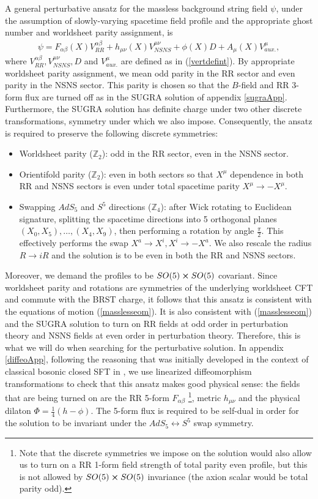 \documentclass[12pt]{article}
\def\ie{\begin{equation}\begin{aligned}}
\def\fe{\end{aligned}\end{equation}}
\numberwithin{equation}{section}
\begin{document}
A general perturbative ansatz for the massless background string field $\psi$, under the assumption of slowly-varying spacetime field profile and the appropriate ghost number and worldsheet parity assignment, is
\ie\label{masslessansatz}
    \psi = F_{\alpha \beta}(X) V^{\alpha\beta}_{RR}+ h_{\mu\nu}(X) V^{\mu \nu}_{NSNS} + \phi(X) D + A_{\mu}(X) V^\mu_{aux.},
\fe
where $V^{\alpha\beta}_{RR},V^{\mu \nu}_{NSNS},D$ and $V^\mu_{aux.}$ are defined as in (\ref{vertdefint}). By appropriate worldsheet parity assignment, we mean odd parity in the RR sector and even parity in the NSNS sector. This parity is chosen so that the $B$-field and RR 3-form flux are turned off as in the SUGRA solution of appendix \ref{sugraApp}. Furthermore, the SUGRA solution has definite charge under two other discrete transformations, symmetry under which we also impose. Consequently, the ansatz is required to preserve the following discrete symmetries:
\begin{itemize}
	\item Worldsheet parity ($\mathbb{Z}_2$): odd in the RR sector, even in the NSNS sector.
	\item Orientifold parity ($\mathbb{Z}_2$): even in both sectors so that $X^\mu$ dependence in both RR and NSNS sectors is even under total spacetime parity $X^\mu \to - X^\mu$.
	\item Swapping $AdS_5$ and $S^5$ directions ($\mathbb{Z}_4$): after Wick rotating to Euclidean signature, splitting the spacetime directions into 5 orthogonal planes $(X_0, X_5), \ldots, (X_4, X_9)$, then performing a rotation by angle $\frac{\pi}{2}$. This effectively performs the swap $X^a \to X^i, X^i \to - X^a$. We also rescale the radius $R \to i R$ and the solution is to be even in both the RR and NSNS sectors.
\end{itemize}
Moreover, we demand the profiles to be $SO(5) \cross SO(5)$ covariant. Since worldsheet parity and rotations are symmetries of the underlying worldsheet CFT and commute with the BRST charge, it follows that this ansatz is consistent with the equations of motion (\ref{masslesseom}). It is also consistent with (\ref{masslesseom}) and the SUGRA solution to turn on RR fields at odd order in perturbation theory and NSNS fields at even order in perturbation theory. Therefore, this is what we will do when searching for the perturbative solution. In appendix \ref{diffeoApp}, following the reasoning that was initially developed in the context of classical bosonic closed SFT in \cite{Mazel:2025fxj}, we use linearized diffeomorphism transformations to check that this ansatz makes good physical sense: the fields that are being turned on are the RR 5-form $F_{\alpha \beta}$ \footnote{ Note that the discrete symmetries we impose on the solution would also allow us to turn on a RR 1-form field strength of total parity even profile, but this is not allowed by $SO(5) \cross SO(5)$ invariance (the axion scalar would be total parity odd).}, metric $h_{\mu \nu}$ and the physical dilaton $\Phi = \frac{1}{4}(h-\phi)$. The 5-form flux is required to be self-dual in order for the solution to be invariant under the $AdS_5 \leftrightarrow S^5$ swap symmetry.
\end{document}
